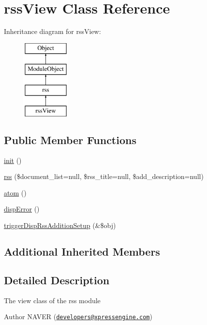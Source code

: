 \hypertarget{classrssView}{}\section{rss\+View Class Reference}
\label{classrssView}
Inheritance diagram for rss\+View\+:\begin{figure}[H]
\begin{center}
\leavevmode
\includegraphics[height=4.000000cm]{classrssView}
\end{center}
\end{figure}
\subsection*{Public Member Functions}
\begin{DoxyCompactItemize}
\item 
\hyperlink{classrssView_af438b469cdde5b47ced8ada179d56c4d}{init} ()
\item 
\hyperlink{classrssView_a769dbe1bd0a000160ac6b4529b645dc7}{rss} (\$document\+\_\+list=null, \$rss\+\_\+title=null, \$add\+\_\+description=null)
\item 
\hyperlink{classrssView_a4c0453c52a946c2fe3643e099235eb62}{atom} ()
\item 
\hyperlink{classrssView_a1e6808d03030aa6f6ff61083798c2422}{disp\+Error} ()
\item 
\hyperlink{classrssView_ac17108a08e3f3c1ed1070fa876cffc15}{trigger\+Disp\+Rss\+Addition\+Setup} (\&\$obj)
\end{DoxyCompactItemize}
\subsection*{Additional Inherited Members}


\subsection{Detailed Description}
The view class of the rss module

\begin{DoxyAuthor}{Author}
N\+A\+V\+ER (\href{mailto:developers@xpressengine.com}{\tt developers@xpressengine.\+com}) 
\end{DoxyAuthor}


